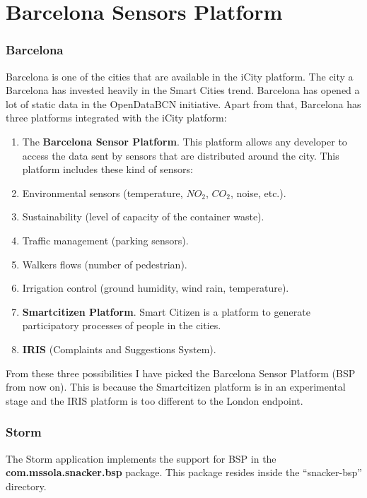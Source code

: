  
\section{Barcelona Sensors Platform}
\label{sec:implementation_bsp}

\subsubsection*{Barcelona}

Barcelona is one of the cities that are available in the iCity platform. The
city a Barcelona has invested heavily in the Smart Cities trend. Barcelona has
opened a lot of static data in the OpenDataBCN initiative. Apart from that,
Barcelona has three platforms integrated with the iCity platform:

\begin{enumerate}
  \itemsep0em
  \item The {\bf Barcelona Sensor Platform}. This platform allows any developer
to access the data sent by sensors that are distributed around the city. This
platform includes these kind of sensors:
    \mylist
      \item Environmental sensors (temperature, $NO_2$, $CO_2$, noise, etc.).
      \item Sustainability (level of capacity of the container waste).
      \item Traffic management (parking sensors).
      \item Walkers flows (number of pedestrian).
      \item Irrigation control (ground humidity, wind rain, temperature).
    \mylistend
  \item {\bf Smartcitizen Platform}. Smart Citizen is a platform to generate
participatory processes of people in the cities.
  \item {\bf IRIS} (Complaints and Suggestions System).
\end{enumerate}

From these three possibilities I have picked the Barcelona Sensor Platform (BSP
from now on). This is because the Smartcitizen platform is in an experimental
stage and the IRIS platform is too different to the London endpoint.

\subsubsection*{Storm}

The Storm application implements the support for BSP in the {\bf
com.mssola.snacker.bsp} package. This package resides inside the
``snacker-bsp'' directory.

